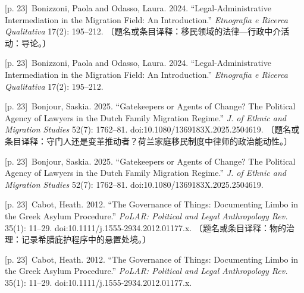 \documentclass[10pt,a4paper]{article}
\begin{document}
\noindent\begin{minipage}{\textwidth}\begin{minipage}[t]{\dimexpr.5\textwidth-4mm\relax}{\scriptsize\color{gray} [p. 23]}\ Bonizzoni, Paola and Odasso, Laura. 2024. “Legal-Administrative Intermediation in the Migration Field: An Introduction.” \textit{Etnografia e Ricerca Qualitativa} 17(2): 195–212. 〔题名或条目译释：移民领域的法律—行政中介活动：导论。〕\par\end{minipage}\hfill\begin{minipage}[t]{\dimexpr.5\textwidth-4mm\relax}{\scriptsize\color{gray} [p. 23]}\ Bonizzoni, Paola and Odasso, Laura. 2024. “Legal-Administrative Intermediation in the Migration Field: An Introduction.” \textit{Etnografia e Ricerca Qualitativa} 17(2): 195–212.\par\end{minipage}\end{minipage}\par
\noindent\begin{minipage}{\textwidth}\begin{minipage}[t]{\dimexpr.5\textwidth-4mm\relax}{\scriptsize\color{gray} [p. 23]}\ Bonjour, Saskia. 2025. “Gatekeepers or Agents of Change? The Political Agency of Lawyers in the Dutch Family Migration Regime.” \textit{J. of Ethnic and Migration Studies} 52(7): 1762–81. doi:10.1080/1369183X.2025.2504619. 〔题名或条目译释：守门人还是变革推动者？荷兰家庭移民制度中律师的政治能动性。〕\par\end{minipage}\hfill\begin{minipage}[t]{\dimexpr.5\textwidth-4mm\relax}{\scriptsize\color{gray} [p. 23]}\ Bonjour, Saskia. 2025. “Gatekeepers or Agents of Change? The Political Agency of Lawyers in the Dutch Family Migration Regime.” \textit{J. of Ethnic and Migration Studies} 52(7): 1762–81. doi:10.1080/1369183X.2025.2504619.\par\end{minipage}\end{minipage}\par
\noindent\begin{minipage}{\textwidth}\begin{minipage}[t]{\dimexpr.5\textwidth-4mm\relax}{\scriptsize\color{gray} [p. 23]}\ Cabot, Heath. 2012. “The Governance of Things: Documenting Limbo in the Greek Asylum Procedure.” \textit{PoLAR: Political and Legal Anthropology Rev.} 35(1): 11–29. doi:10.1111/j.1555-2934.2012.01177.x. 〔题名或条目译释：物的治理：记录希腊庇护程序中的悬置处境。〕\par\end{minipage}\hfill\begin{minipage}[t]{\dimexpr.5\textwidth-4mm\relax}{\scriptsize\color{gray} [p. 23]}\ Cabot, Heath. 2012. “The Governance of Things: Documenting Limbo in the Greek Asylum Procedure.” \textit{PoLAR: Political and Legal Anthropology Rev.} 35(1): 11–29. doi:10.1111/j.1555-2934.2012.01177.x.\par\end{minipage}\end{minipage}\par
\end{document}
